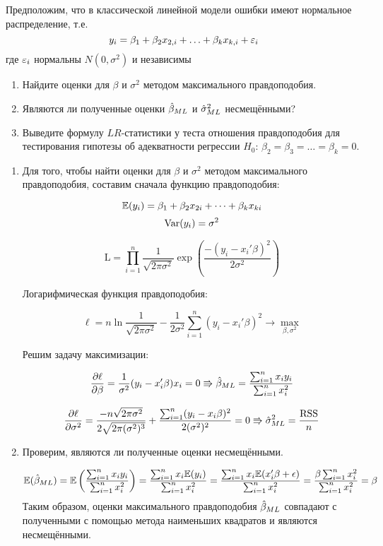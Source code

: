\begin{problem}
Предположим, что в классической линейной модели ошибки имеют нормальное распределение, т.е.
\[
y_i=\beta_1+\beta_2 x_{2,i}+\ldots+\beta_k x_{k,i}+\varepsilon_i
\]
где $\varepsilon_i$ нормальны $N(0,\sigma^2)$ и независимы
\begin{enumerate}
\item Найдите оценки для $\beta$ и $\sigma^2$ методом максимального правдоподобия.
\item Являются ли полученные оценки $\hat{\beta}_{ML}$ и $\hat{\sigma}^2_{ML}$ несмещёнными?
\item Выведите формулу $LR$-статистики у теста отношения правдоподобия для тестирования гипотезы об адекватности регрессии $H_0$: $\beta_2=\beta_3=\ldots=\beta_k=0$.
\end{enumerate}


\begin{sol}
\begin{enumerate}
\item Для того, чтобы найти оценки для $\beta$ и $\sigma^2$ методом максимального правдоподобия, составим сначала функцию правдоподобия:

\[\mathbb{E}(y_i) = \beta_1 + \beta_2x_{2i}+\dots+\beta_kx_{ki}\]
\[\operatorname{Var}(y_i) = \sigma^2\]

\[\text{L} = \prod_{i=1}^{n} \frac{1}{\sqrt{2\pi \sigma^2}}\exp\left( \frac{-(y_i - x_i'\beta)^2}{2\sigma^2}\right) \]

Логарифмическая функция правдоподобия:

\[\ell = n \ln \frac{1}{\sqrt{2\pi\sigma^2}} - \frac{1}{2\sigma^2} \sum_{i=1}^{n} (y_i - x_i'\beta)^2 \to \max_{\beta, \sigma^2}\]

Решим задачу максимизации:

\[\frac{\partial \ell}{\partial\beta} = \frac{1}{\sigma^2}(y_i-x_i'\beta)x_i=0 \Rrightarrow \hat{\beta}_{ML} = \frac{\sum_{i=1}^{n} x_iy_i}{\sum_{i=1}^{n}x_i^2}\]

\[\frac{\partial \ell}{\partial\sigma^2} = \frac{-n\sqrt{2\pi\sigma^2}}{2\sqrt{2\pi(\sigma^2)^3}} + \frac{\sum_{i=1}^{n} (y_i - x_i\beta)^2}{2(\sigma^2)^2}=0 \Rrightarrow \hat{\sigma}^2_{ML} = \frac{\text{RSS}}{n}\]

\item Проверим, являются ли полученные оценки несмещёнными.

\[\mathbb{E}(\hat{\beta}_{ML}) = \mathbb{E}\left( \frac{\sum_{i=1}^{n} x_iy_i}{\sum_{i=1}^{n}x_i^2}\right) = \frac{\sum_{i=1}^{n} x_i\mathbb{E}(y_i)}{\sum_{i=1}^{n}x_i^2} = \frac{\sum_{i=1}^{n} x_i\mathbb{E}(x_i'\beta + \epsilon)}{\sum_{i=1}^{n}x_i^2} = \frac{\beta\sum_{i=1}^{n} x_i^2}{\sum_{i=1}^{n}x_i^2} = \beta\]
Таким образом, оценки максимального правдоподобия $\hat{\beta}_{ML}$ совпадают с полученными с помощью метода наименьших квадратов и являются несмещёнными.


\end{enumerate}
\end{sol}
\end{problem}
